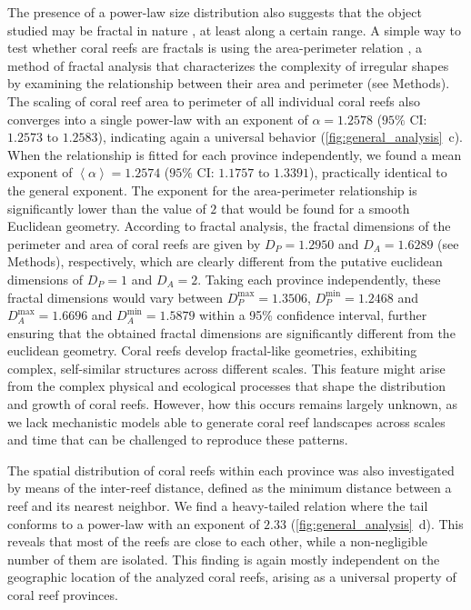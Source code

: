 The presence of a power-law size distribution also suggests that the object
studied may be fractal in nature \cite{Mori2020, PINTO2014, Seekell2013,
    Sorensen1999, Vidondo1997}, at least along a certain range. A simple way to
test whether coral reefs are fractals is using the area-perimeter relation
\cite{MAN83, Lovejoy1982}, a method of fractal analysis that characterizes the
complexity of irregular shapes by examining the relationship between their area
and perimeter (see Methods). The scaling of coral reef area to perimeter of all
individual coral reefs also converges into a single power-law with an exponent
of $\alpha=1.2578$ ($95\%$ CI: $1.2573$ to $1.2583$), indicating again a
universal behavior (\cref{fig:general_analysis}~\textcolor{ref_color}{c}). When
the relationship is
fitted for each province independently, we found a mean exponent of
$\left<\alpha\right>=1.2574$ ($95\%$ CI: $1.1757$ to $1.3391$), practically
identical to the general exponent. The exponent for the area-perimeter
relationship is significantly lower than the value of $2$ that would be found
for a smooth Euclidean geometry. According to fractal analysis, the fractal
dimensions of the perimeter and area of coral reefs are given by $D_P=1.2950$
and $D_A=1.6289$ (see Methods), respectively, which are clearly different from
the putative euclidean dimensions of $D_P=1$ and $D_A=2$. Taking each province
independently, these fractal dimensions would vary between
$D_P^{\mathrm{max}}=1.3506$, $D_P^{\mathrm{min}}=1.2468$ and
$D_A^{\mathrm{max}}=1.6696$ and $D_A^{\mathrm{min}}=1.5879$ within a 95\%
confidence interval, further ensuring that the obtained fractal dimensions are
significantly different from the euclidean geometry. Coral reefs develop
fractal-like geometries, exhibiting complex, self-similar structures across
different scales. This feature might arise from the complex physical and
ecological processes that shape the distribution and growth of coral reefs.
However, how this occurs remains largely unknown, as we lack mechanistic models
able to generate coral reef landscapes across scales and time that can be
challenged to reproduce these patterns.

The spatial distribution of coral reefs within each province was also
investigated by means of the inter-reef distance, defined as the minimum
distance between a reef and its nearest neighbor. We find a heavy-tailed
relation where the tail conforms to a power-law with an exponent of $2.33$
(\cref{fig:general_analysis}~\textcolor{ref_color}{d}). This reveals that most
of the reefs are close
to each other, while a non-negligible number of them are isolated. This finding
is again mostly independent on the geographic location of the analyzed coral
reefs, arising as a universal property of coral reef provinces.

